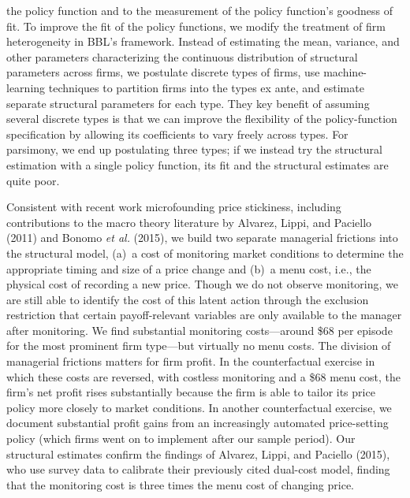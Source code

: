 \documentclass[11pt]{article}
\begin{document}
\begin{spacing}{1.3}
the policy function and to the measurement of the policy function's
goodness of fit.  To improve the fit of the policy functions, we
modify the treatment of firm heterogeneity in BBL's framework. Instead
of estimating the mean, variance, and other parameters characterizing
the continuous distribution of structural parameters across firms, we
postulate discrete types of firms, use machine-learning techniques to
partition firms into the types ex ante, and estimate separate
structural parameters for each type. They key benefit of assuming
several discrete types is that we can improve the flexibility of the
policy-function specification by allowing its coefficients to vary
freely across types. For parsimony, we end up postulating three types;
if we instead try the structural estimation with a single policy
function, its fit and the structural estimates are quite poor.

Consistent with recent work microfounding price stickiness, including
contributions to the macro theory literature by Alvarez, Lippi, and
Paciello (2011) and Bonomo {\em et al.} (2015), we build two separate
managerial frictions into the structural model, (a)~a cost of
monitoring market conditions to determine the appropriate timing and
size of a price change and (b)~a menu cost, i.e., the physical cost of
recording a new price. Though we do not observe monitoring, we are
still able to identify the cost of this latent action through the
exclusion restriction that certain payoff-relevant variables are only
available to the manager after monitoring. We find substantial
monitoring costs---around \$68 per episode for the most prominent firm
type---but virtually no menu costs. The division of managerial
frictions matters for firm profit. In the counterfactual exercise in
which these costs are reversed, with costless monitoring and a \$68
menu cost, the firm's net profit rises substantially because the firm
is able to tailor its price policy more closely to market
conditions. In another counterfactual exercise, we document
substantial profit gains from an increasingly automated price-setting
policy (which firms went on to implement after our sample period).
Our structural estimates confirm the findings of Alvarez, Lippi, and
Paciello (2015), who use survey data to calibrate their previously
cited dual-cost model, finding that the monitoring cost is three times
the menu cost of changing price.


\end{spacing}
\end{document}
